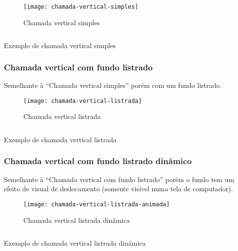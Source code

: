 \begin{figure}[!ht]
    \centering
    \texttt{[image: chamada-vertical-simples]}
    \caption{Chamada vertical simples}\label{RS0001:fig:chamada-vertical-simples}
\end{figure}

\begin{code}
    \inputminted[label=chamada-vertical-simples.html]{html}{../RS0001/anexos/chamada-vertical-simples.html}
    \caption{Exemplo de chamada vertical simples}\label{RS0001:code:exemplo-chamada-vertical-simples}
\end{code}


\subsubsection{Chamada vertical com fundo listrado}

Semelhante à ``Chamada vertical simples'' porém com um fundo listrado.

\begin{figure}[!ht]
    \centering
    \texttt{[image: chamada-vertical-listrada]}
    \caption{Chamada vertical listrada}\label{RS0001:fig:chamada-vertical-listrada}
\end{figure}

\begin{code}
    \inputminted[label=chamada-vertical-listrada.html]{html}{../RS0001/anexos/chamada-vertical-listrada.html}
    \caption{Exemplo de chamada vertical listrada}\label{RS0001:code:exemplo-chamada-vertical-listrada}
\end{code}


\subsubsection{Chamada vertical com fundo listrado dinâmico}

Semelhante à ``Chamada vertical com fundo listrado'' porém o fundo tem um efeito de visual de deslocamento (somente visível numa tela de computador).

\begin{figure}[!ht]
    \centering
    \texttt{[image: chamada-vertical-listrada-animada]}
    \caption{Chamada vertical listrada dinâmica}\label{RS0001:fig:chamada-vertical-listrada-animada}
\end{figure}

\begin{code}
    \inputminted[label=chamada-vertical-listrada-animada.html]{html}{../RS0001/anexos/chamada-vertical-listrada-animada.html}
    \caption{Exemplo de chamada vertical listrada dinâmica}\label{RS0001:code:exemplo-chamada-vertical-listrada-animada}
\end{code}



